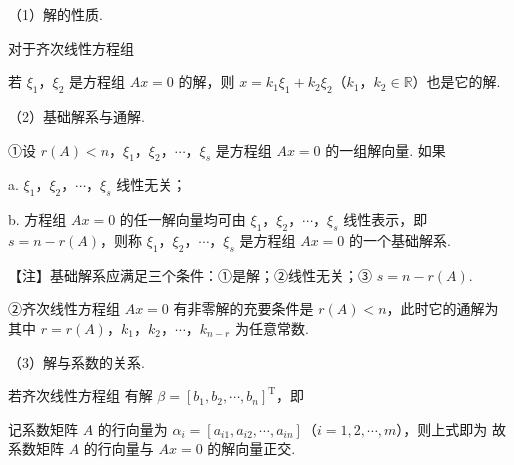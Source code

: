 

（1）解的性质.

对于齐次线性方程组

若 $\xi_1$，$\xi_2$ 是方程组 $Ax=0$ 的解，则 $x=k_1\xi_1+k_2\xi_2$（$k_1$，$k_2\in\mathbb{R}$）也是它的解.

（2）基础解系与通解.

①设 $r(A)<n$，$\xi_1$，$\xi_2$，$\cdots$，$\xi_s$ 是方程组 $Ax=0$ 的一组解向量. 如果

a. $\xi_1$，$\xi_2$，$\cdots$，$\xi_s$ 线性无关；

b. 方程组 $Ax=0$ 的任一解向量均可由 $\xi_1$，$\xi_2$，$\cdots$，$\xi_s$ 线性表示，即 $s=n-r(A)$，则称 $\xi_1$，$\xi_2$，$\cdots$，$\xi_s$ 是方程组 $Ax=0$ 的一个基础解系.


\begin{fnote}
【注】基础解系应满足三个条件：①是解；②线性无关；③ $s=n-r(A)$.
\end{fnote}

②齐次线性方程组 $Ax=0$ 有非零解的充要条件是 $r(A)<n$，此时它的通解为
其中 $r=r(A)$，$k_1$，$k_2$，$\cdots$，$k_{n-r}$ 为任意常数.

（3）解与系数的关系.

若齐次线性方程组
有解 $\beta=[b_1,b_2,\cdots,b_n]^{\mathrm T}$，即


记系数矩阵 $A$ 的行向量为 $\alpha_i=[a_{i1},a_{i2},\cdots,a_{in}]$（$i=1,2,\cdots,m$），则上式即为
故系数矩阵 $A$ 的行向量与 $Ax=0$ 的解向量正交.


